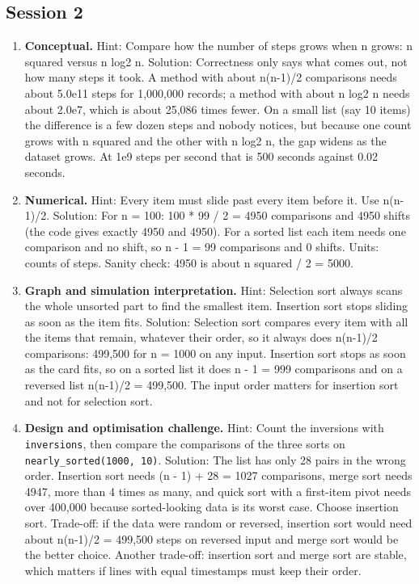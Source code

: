 \documentclass[11pt,a4paper]{article}
\begin{document}
\subsection*{Session 2}
\begin{enumerate}[nosep]
\item \textbf{Conceptual.} Hint: Compare how the number of steps grows when n grows: n squared versus n log2 n. Solution: Correctness only says what comes out, not how many steps it took. A method with about n(n-1)/2 comparisons needs about 5.0e11 steps for 1,000,000 records; a method with about n log2 n needs about 2.0e7, which is about 25,086 times fewer. On a small list (say 10 items) the difference is a few dozen steps and nobody notices, but because one count grows with n squared and the other with n log2 n, the gap widens as the dataset grows. At 1e9 steps per second that is 500 seconds against 0.02 seconds.
\item \textbf{Numerical.} Hint: Every item must slide past every item before it. Use n(n-1)/2. Solution: For n = 100: 100 * 99 / 2 = 4950 comparisons and 4950 shifts (the code gives exactly 4950 and 4950). For a sorted list each item needs one comparison and no shift, so n - 1 = 99 comparisons and 0 shifts. Units: counts of steps. Sanity check: 4950 is about n squared / 2 = 5000.
\item \textbf{Graph and simulation interpretation.} Hint: Selection sort always scans the whole unsorted part to find the smallest item. Insertion sort stops sliding as soon as the item fits. Solution: Selection sort compares every item with all the items that remain, whatever their order, so it always does n(n-1)/2 comparisons: 499,500 for n = 1000 on any input. Insertion sort stops as soon as the card fits, so on a sorted list it does n - 1 = 999 comparisons and on a reversed list n(n-1)/2 = 499,500. The input order matters for insertion sort and not for selection sort.
\item \textbf{Design and optimisation challenge.} Hint: Count the inversions with \texttt{inversions}, then compare the comparisons of the three sorts on \texttt{nearly\_sorted(1000, 10)}. Solution: The list has only 28 pairs in the wrong order. Insertion sort needs (n - 1) + 28 = 1027 comparisons, merge sort needs 4947, more than 4 times as many, and quick sort with a first-item pivot needs over 400,000 because sorted-looking data is its worst case. Choose insertion sort. Trade-off: if the data were random or reversed, insertion sort would need about n(n-1)/2 = 499,500 steps on reversed input and merge sort would be the better choice. Another trade-off: insertion sort and merge sort are stable, which matters if lines with equal timestamps must keep their order.
\end{enumerate}
\end{document}
